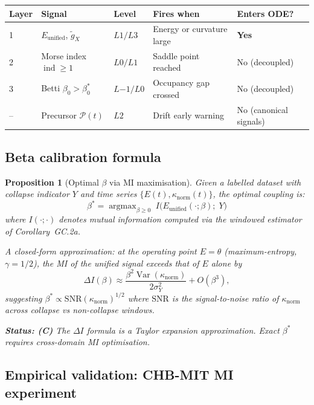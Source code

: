 \documentclass[11pt,a4paper]{article}
\newtheorem{proposition}[theorem]{Proposition}
\theoremstyle{definition}
\begin{document}
\begin{center}
\renewcommand{\arraystretch}{1.4}
\begin{tabular}{lllll}
\toprule
\textbf{Layer} & \textbf{Signal} & \textbf{Level} & \textbf{Fires when} & \textbf{Enters ODE?} \\
\midrule
1 & $E_\mathrm{unified}$, $\tilde g_X$ & $L1/L3$ & Energy or curvature large & \textbf{Yes} \\
2 & Morse index $\operatorname{ind} \geq 1$ & $L0/L1$ & Saddle point reached & No (decoupled) \\
3 & Betti $\beta_0 > \beta_0^*$ & $L{-1}/L0$ & Occupancy gap crossed & No (decoupled) \\
-- & Precursor $\mathcal{P}(t)$ & $L2$ & Drift early warning & No (canonical signals) \\
\bottomrule
\end{tabular}
\end{center}

\subsection{Beta calibration formula}

\begin{proposition}[Optimal $\beta$ via MI maximisation]
\label{prop:beta_cal}
Given a labelled dataset with collapse indicator $Y$
and time series $\{E(t), \kappa_\mathrm{norm}(t)\}$,
the optimal coupling is:
\[
\beta^* = \operatorname{argmax}_{\beta \geq 0}\;
I\bigl(E_\mathrm{unified}(\cdot;\beta);\; Y\bigr)
\]
where $I(\cdot;\cdot)$ denotes mutual information computed
via the windowed estimator of Corollary~GC.2a.

A closed-form approximation: at the operating point
$E = \theta$ (maximum-entropy, $\gamma = 1/2$), the MI
of the unified signal exceeds that of $E$ alone by
\[
\Delta I(\beta) \approx \frac{\beta^2\operatorname{Var}(\kappa_\mathrm{norm})}{2\sigma_Y^2}
+ O(\beta^3),
\]
suggesting $\beta^* \propto \mathrm{SNR}(\kappa_\mathrm{norm})^{1/2}$
where $\mathrm{SNR}$ is the signal-to-noise ratio of $\kappa_\mathrm{norm}$
across collapse vs non-collapse windows.

\textbf{Status: (C)} The $\Delta I$ formula is a Taylor expansion
approximation. Exact $\beta^*$ requires cross-domain MI optimisation.
\end{proposition}

\subsection{Empirical validation: CHB-MIT MI experiment}
\label{subsec:mi_experiment}
\end{document}
